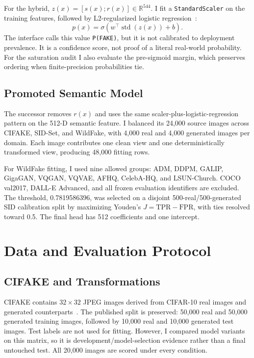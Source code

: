 \documentclass[10pt,twocolumn]{article}
\newcommand{\code}[1]{\texttt{#1}}
\begin{document}
For the hybrid, $z(x)=[s(x);r(x)]\in\mathbb{R}^{544}$. I fit a \code{StandardScaler} on the training
features, followed by L2-regularized logistic regression~\cite{pedregosa2011sklearn}:
\begin{equation}
 p(x)=\sigma\!\left(w^\top\operatorname{std}(z(x))+b\right).
\end{equation}
The interface calls this value \code{P(FAKE)}, but it is not calibrated to deployment prevalence. It
is a confidence score, not proof of a literal real-world probability. For the saturation audit I also
evaluate the pre-sigmoid margin, which preserves ordering when finite-precision probabilities tie.

\subsection{Promoted Semantic Model}

The successor removes $r(x)$ and uses the same scaler-plus-logistic-regression pattern on the 512-D
semantic feature. I balanced its 24,000 source images across CIFAKE, SID-Set, and WildFake, with
4,000 real and 4,000 generated images per domain. Each image contributes one clean view and one
deterministically transformed view, producing 48,000 fitting rows.

For WildFake fitting, I used nine allowed groups: ADM, DDPM, GALIP, GigaGAN, VQGAN, VQVAE, AFHQ,
CelebA-HQ, and LSUN-Church. COCO val2017, DALL-E Advanced, and all frozen evaluation identifiers are
excluded. The threshold, 0.7819586396, was selected on a disjoint 500-real/500-generated SID
calibration split by maximizing Youden's $J=\mathrm{TPR}-\mathrm{FPR}$, with ties resolved toward 0.5.
The final head has 512 coefficients and one intercept.

\section{Data and Evaluation Protocol}

\subsection{CIFAKE and Transformations}

CIFAKE contains $32\times32$ JPEG images derived from CIFAR-10 real images and generated
counterparts~\cite{bird2024cifake}. The published split is preserved: 50,000 real and 50,000 generated
training images, followed by 10,000 real and 10,000 generated test images. Test labels are not used for
fitting. However, I compared model variants on this matrix, so it is development/model-selection
evidence rather than a final untouched test. All 20,000 images are scored under every condition.
\end{document}

